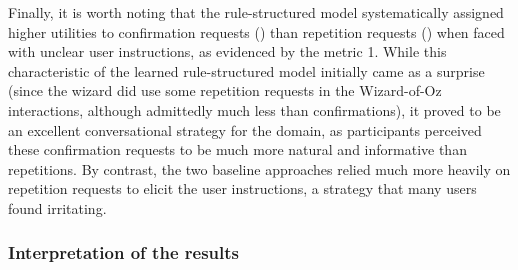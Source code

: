 Finally, it is worth noting that the rule-structured model systematically assigned higher utilities to confirmation requests () than repetition requests () when faced with unclear user instructions, as evidenced by the metric 1. While this characteristic of the learned rule-structured model initially came as a surprise (since the wizard did use some repetition requests in the Wizard-of-Oz interactions, although admittedly much less than confirmations), it proved to be an excellent conversational strategy for the domain, as participants perceived these confirmation requests to be much more natural and informative than repetitions. By contrast, the two baseline approaches relied much more heavily on repetition requests to elicit the user instructions, a strategy that many users found irritating. 

\subsubsection*{Interpretation of the results}

